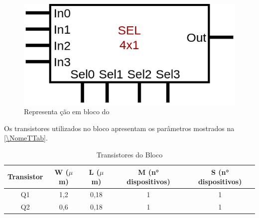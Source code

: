 \begin{figure}[htb]
 \label{NomeSFig}
 \centering
    \centering
    \caption{Representa ção em bloco do \NomeBloco} \label{NomeSFig}
    \includegraphics[scale=0.3]{Circuitos/sel4x1_block.png}
\end{figure}

Os transistores utilizados no bloco \NomeBloco{} apresentam os par\^ametros mostrados na \autoref{\NomeTTab}.

\begin{table}[htbp]
\caption{Transistores do Bloco \NomeBloco}
\label{\NomeTTab}
\centering
\begin{tabular}{ccccc}
\toprule
Transistor & W ($\mu$m)  & L ($\mu$m)           & M (n° dispositivos) & S (n° dispositivos)\\
\midrule \midrule
Q1 & 1,2 & 0,18 & 1 & 1\\
\midrule
Q2 & 0,6 & 0,18 & 1 & 1\\
\bottomrule
\end{tabular}
\end{table}